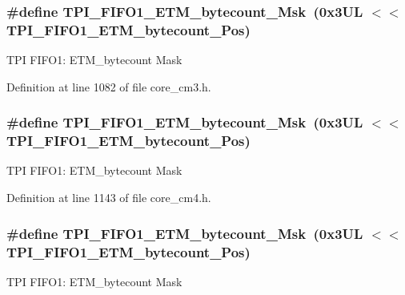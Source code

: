 \subsubsection[{\texorpdfstring{T\+P\+I\+\_\+\+F\+I\+F\+O1\+\_\+\+E\+T\+M\+\_\+bytecount\+\_\+\+Msk}{TPI_FIFO1_ETM_bytecount_Msk}}]{\setlength{\rightskip}{0pt plus 5cm}\#define T\+P\+I\+\_\+\+F\+I\+F\+O1\+\_\+\+E\+T\+M\+\_\+bytecount\+\_\+\+Msk~(0x3\+U\+L $<$$<$ T\+P\+I\+\_\+\+F\+I\+F\+O1\+\_\+\+E\+T\+M\+\_\+bytecount\+\_\+\+Pos)}\hypertarget{group___c_m_s_i_s___t_p_i_gab554305459953b80554fdb1908b73291}{}\label{group___c_m_s_i_s___t_p_i_gab554305459953b80554fdb1908b73291}
T\+PI F\+I\+F\+O1\+: E\+T\+M\+\_\+bytecount Mask 

Definition at line 1082 of file core\+\_\+cm3.\+h.

\subsubsection[{\texorpdfstring{T\+P\+I\+\_\+\+F\+I\+F\+O1\+\_\+\+E\+T\+M\+\_\+bytecount\+\_\+\+Msk}{TPI_FIFO1_ETM_bytecount_Msk}}]{\setlength{\rightskip}{0pt plus 5cm}\#define T\+P\+I\+\_\+\+F\+I\+F\+O1\+\_\+\+E\+T\+M\+\_\+bytecount\+\_\+\+Msk~(0x3\+U\+L $<$$<$ T\+P\+I\+\_\+\+F\+I\+F\+O1\+\_\+\+E\+T\+M\+\_\+bytecount\+\_\+\+Pos)}\hypertarget{group___c_m_s_i_s___t_p_i_gab554305459953b80554fdb1908b73291}{}\label{group___c_m_s_i_s___t_p_i_gab554305459953b80554fdb1908b73291}
T\+PI F\+I\+F\+O1\+: E\+T\+M\+\_\+bytecount Mask 

Definition at line 1143 of file core\+\_\+cm4.\+h.

\subsubsection[{\texorpdfstring{T\+P\+I\+\_\+\+F\+I\+F\+O1\+\_\+\+E\+T\+M\+\_\+bytecount\+\_\+\+Msk}{TPI_FIFO1_ETM_bytecount_Msk}}]{\setlength{\rightskip}{0pt plus 5cm}\#define T\+P\+I\+\_\+\+F\+I\+F\+O1\+\_\+\+E\+T\+M\+\_\+bytecount\+\_\+\+Msk~(0x3\+U\+L $<$$<$ T\+P\+I\+\_\+\+F\+I\+F\+O1\+\_\+\+E\+T\+M\+\_\+bytecount\+\_\+\+Pos)}\hypertarget{group___c_m_s_i_s___t_p_i_gab554305459953b80554fdb1908b73291}{}\label{group___c_m_s_i_s___t_p_i_gab554305459953b80554fdb1908b73291}
T\+PI F\+I\+F\+O1\+: E\+T\+M\+\_\+bytecount Mask 

